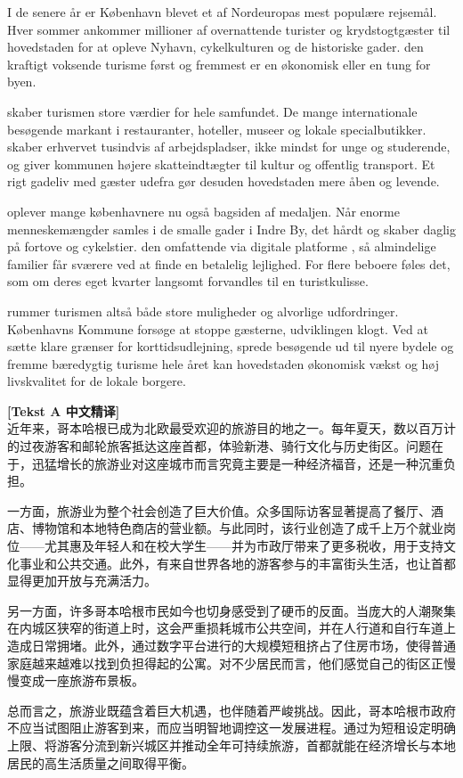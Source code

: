 I de senere år er København blevet et af Nordeuropas mest populære rejsemål. Hver sommer ankommer millioner af overnattende turister og krydstogtgæster til hovedstaden for at opleve Nyhavn, cykelkulturen og de historiske gader.  den kraftigt voksende turisme først og fremmest er en økonomisk  eller en tung  for byen.

 skaber turismen store værdier for hele samfundet. De mange internationale besøgende  markant i restauranter, hoteller, museer og lokale specialbutikker.  skaber erhvervet tusindvis af arbejdspladser, ikke mindst for unge og studerende, og giver kommunen højere skatteindtægter til kultur og offentlig transport. Et rigt gadeliv med gæster udefra gør desuden hovedstaden mere åben og levende.

 oplever mange københavnere nu også bagsiden af medaljen. Når enorme menneskemængder samles i de smalle gader i Indre By,  det hårdt  og skaber daglig  på fortove og cykelstier.  den omfattende  via digitale platforme , så almindelige familier får sværere ved at finde en betalelig lejlighed. For flere beboere føles det, som om deres eget kvarter langsomt forvandles til en turistkulisse.

 rummer turismen altså både store muligheder og alvorlige udfordringer.  Københavns Kommune  forsøge at stoppe gæsterne,  udviklingen klogt. Ved at sætte klare grænser for korttidsudlejning, sprede besøgende ud til nyere bydele og fremme bæredygtig turisme hele året kan hovedstaden  økonomisk vækst og høj livskvalitet for de lokale borgere.

\begin{transbox}
\small
\textbf{\color{NCDTeal}[Tekst A 中文精译]}\\
近年来，哥本哈根已成为北欧最受欢迎的旅游目的地之一。每年夏天，数以百万计的过夜游客和邮轮旅客抵达这座首都，体验新港、骑行文化与历史街区。问题在于，迅猛增长的旅游业对这座城市而言究竟主要是一种经济福音，还是一种沉重负担。

一方面，旅游业为整个社会创造了巨大价值。众多国际访客显著提高了餐厅、酒店、博物馆和本地特色商店的营业额。与此同时，该行业创造了成千上万个就业岗位——尤其惠及年轻人和在校大学生——并为市政厅带来了更多税收，用于支持文化事业和公共交通。此外，有来自世界各地的游客参与的丰富街头生活，也让首都显得更加开放与充满活力。

另一方面，许多哥本哈根市民如今也切身感受到了硬币的反面。当庞大的人潮聚集在内城区狭窄的街道上时，这会严重损耗城市公共空间，并在人行道和自行车道上造成日常拥堵。此外，通过数字平台进行的大规模短租挤占了住房市场，使得普通家庭越来越难以找到负担得起的公寓。对不少居民而言，他们感觉自己的街区正慢慢变成一座旅游布景板。

总而言之，旅游业既蕴含着巨大机遇，也伴随着严峻挑战。因此，哥本哈根市政府不应当试图阻止游客到来，而应当明智地调控这一发展进程。通过为短租设定明确上限、将游客分流到新兴城区并推动全年可持续旅游，首都就能在经济增长与本地居民的高生活质量之间取得平衡。
\end{transbox}

